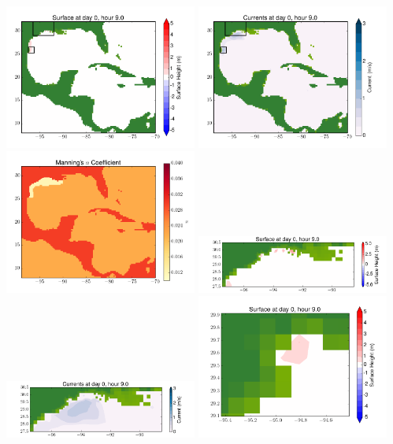 \documentclass[11pt]{article}
\begin{document}
\vskip 10pt 
\includegraphics[width=0.475\textwidth]{frame0081fig1.png}
\includegraphics[width=0.475\textwidth]{frame0081fig2.png}
\vskip 10pt 
\includegraphics[width=0.475\textwidth]{frame0081fig3.png}
\includegraphics[width=0.475\textwidth]{frame0081fig4.png}
\vskip 10pt 
\includegraphics[width=0.475\textwidth]{frame0081fig5.png}
\includegraphics[width=0.475\textwidth]{frame0081fig6.png}
\end{document}

